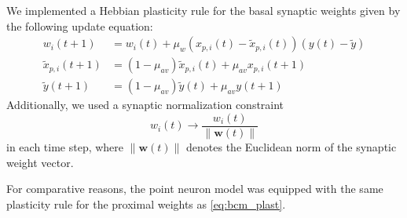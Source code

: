 \documentclass[10pt,a4paper,twocolumn]{article}
\begin{document}
		We implemented a Hebbian plasticity rule for the basal 
		synaptic weights given by the following update equation:
		\begin{align}
			w_i(t+1) &= w_i(t) + \mu_w \left(x_{p,i}(t) - \tilde{x}_{p,i}(t)\right)
			\left(y(t) - \tilde{y} \right)
			\label{eq:bcm_plast} \\
			\tilde{x}_{p,i}(t+1) &= (1-\mu_{av})\tilde{x}_{p,i}(t) + \mu_{av}x_{p,i}(t+1) \\
			\tilde{y}(t+1) &= (1-\mu_{av})\tilde{y}(t) + \mu_{av}y(t+1)
		\end{align}
		Additionally, we used a
		synaptic normalization constraint
		\begin{equation}
			w_i(t) \rightarrow \frac{w_i(t)}{\lVert \mathbf{w}(t)\rVert}
			\label{eq:weight_norm}
		\end{equation}
		in each time step, where $\lVert \mathbf{w}(t)\rVert$ denotes the Euclidean
		norm of the synaptic weight vector. 
		
		For comparative reasons, the point neuron model was equipped with the
		same plasticity rule for the proximal weights as \eqref{eq:bcm_plast}. 
		
\end{document}
